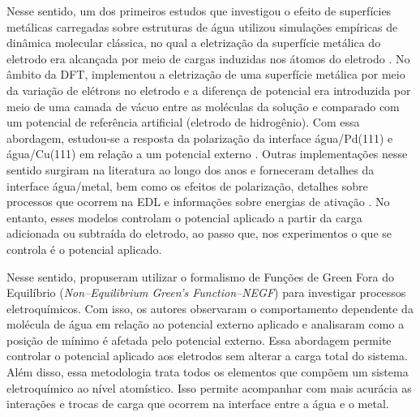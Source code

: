 

Nesse sentido, um dos primeiros estudos que investigou o efeito de superfícies metálicas carregadas sobre estruturas de água utilizou simulações empíricas de dinâmica molecular clássica, no qual a eletrização da superfície metálica do eletrodo era alcançada por meio de cargas induzidas nos átomos do eletrodo \cite{charge1}. No âmbito da DFT, \citeauthor{bias-pd} implementou a eletrização de uma superfície metálica por meio da variação de elétrons no eletrodo e a diferença de potencial era introduzida por meio de uma camada de vácuo entre as moléculas da solução e comparado com um potencial de referência artificial (eletrodo de hidrogênio). Com essa abordagem, estudou-se a resposta da polarização da interface água/Pd(111) e água/Cu(111) em relação a um potencial externo \cite{charge2,bias-pd}. Outras implementações nesse sentido surgiram na literatura ao longo dos anos e forneceram detalhes da interface água/metal, bem como os efeitos de polarização, detalhes sobre processos que ocorrem na EDL e informações sobre energias de ativação \cite{hydrogen2,hydrogen1,hydrogen3,hydrogen4,hydrogen5}. No entanto, esses modelos controlam o potencial aplicado a partir da carga adicionada ou subtraída do eletrodo, ao passo que, nos experimentos o que se controla é o potencial aplicado.

Nesse sentido, \citeauthor{artigo-luana} propuseram utilizar o formalismo de Funções de Green Fora do Equilíbrio (\textit{Non--Equilibrium Green’s Function--NEGF}) para investigar processos eletroquímicos. Com isso, os autores observaram o comportamento dependente da molécula de água em relação ao potencial externo aplicado e analisaram como a posição de mínimo é afetada pelo potencial externo. Essa abordagem permite controlar o potencial aplicado aos eletrodos sem alterar a carga total do sistema. Além disso, essa metodologia trata todos os elementos que compõem um sistema eletroquímico ao nível atomístico. Isso permite acompanhar com mais acurácia as interações e trocas de carga que ocorrem na interface entre a água e o metal. 




